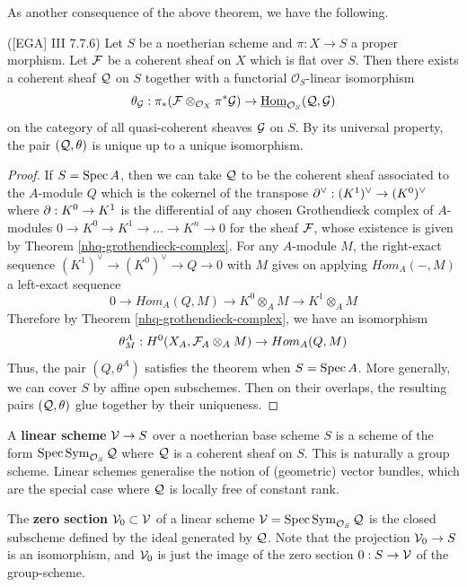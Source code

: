 As another consequence of the above theorem, we have the following.


\begin{theorem}\label{nhq-cokernel-dual} {\rm ([EGA] III 7.7.6) }
Let $S$ be a noetherian scheme and $\pi : X \to S$ a proper morphism.
Let $\mathcal{F}$ be a coherent sheaf on $X$ which is flat over $S$.
Then there exists a coherent sheaf $\mathcal{Q}$ on $S$ together with
a functorial ${\mathcal O}_S$-linear isomorphism
$$\theta_{\mathcal{G}} : \pi_*(\mathcal{F} \otimes_{{\mathcal O}_X} \pi^*\mathcal{G}) \to \underline{\operatorname{Hom}}_{{\mathcal O}_S}(\mathcal{Q},\mathcal{G})$$
on the category of all quasi-coherent sheaves $\mathcal{G}$ on $S$.
By its universal property,
the pair $(\mathcal{Q}, \theta)$ is unique up to a unique isomorphism.
\end{theorem}


\begin{proof} If $S =\operatorname{Spec} A$, then
we can take $\mathcal{Q}$ to be the coherent sheaf associated to the $A$-module
$Q$ which is the cokernel of the
transpose $\partial^{\vee} : (K^1)^{\vee} \to (K^0)^{\vee}$ where
$\partial: K^0 \to K^1$ is the differential of any chosen Grothendieck
complex of $A$-modules
$0\to K^0 \to K^1 \to \ldots \to K^n\to 0$ for the
sheaf $\mathcal{F}$, whose existence is given by Theorem \ref{nhq-grothendieck-complex}.
For any $A$-module $M$,
the right-exact sequence
$(K^1)^{\vee} \to (K^0)^{\vee} \to Q\to 0$ with $M$
gives on applying $Hom_A(-,M)$ a left-exact sequence
$$0 \to Hom_A(Q, M) \to K^0\otimes_AM \to K^1\otimes_AM$$
Therefore by Theorem \ref{nhq-grothendieck-complex}, we have
an isomorphism
$$\theta^A_M : H^0(X_A, \mathcal{F}_A \otimes_A M)  \to  Hom_A(Q, M)$$
Thus, the pair $(Q, \theta^A)$
satisfies the theorem when $S = \operatorname{Spec} A$. More generally, we can cover
$S$ by affine open subschemes. Then on their overlaps,
the resulting pairs $(\mathcal{Q},\theta)$ glue together by their uniqueness.
\end{proof}


\begin{definition}\label{nhq-linear-scheme}
A \textbf{linear scheme} $\mathcal{V} \to S$ over a noetherian base scheme $S$ is
a scheme of the form $\operatorname{Spec} \operatorname{Sym}_{{\mathcal O}_S} \mathcal{Q} $ where $\mathcal{Q}$ is a coherent
sheaf on $S$. This is naturally a group scheme. Linear schemes
generalise the notion of (geometric) vector bundles, which are the
special case where $\mathcal{Q}$ is locally free of constant rank.

The \textbf{zero section} $\mathcal{V}_0 \subset \mathcal{V}$ of a linear scheme
$\mathcal{V} = \operatorname{Spec} \operatorname{Sym}_{{\mathcal O}_S}\mathcal{Q}$ is the closed subscheme defined
by the ideal generated by $\mathcal{Q}$. Note that the projection $\mathcal{V}_0 \to S$
is an isomorphism, and $\mathcal{V}_0$ is just
the image of the zero section $0 : S \to \mathcal{V}$ of the group-scheme.
\end{definition}


